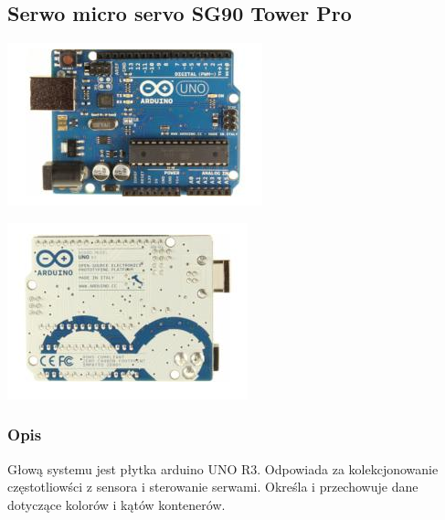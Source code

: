 \documentclass[12pt]{article}
\begin{document}
\subsection{Serwo micro servo SG90 Tower Pro}
\begin{center}
\begin{minipage}[H]{.8\textwidth}
    \includegraphics[width=1.0\linewidth]{ard_front.png}
\end{minipage}
\begin{minipage}[H]{.8\textwidth}
    \includegraphics[width=1.0\linewidth]{ard_back.png}
\end{minipage}
\end{center}
\subsubsection{Opis}
Głową systemu  jest płytka arduino UNO R3.  Odpowiada za kolekcjonowanie częstotliowści z sensora i sterowanie serwami. Określa i przechowuje dane dotyczące kolorów i kątów kontenerów.
\end{document}
